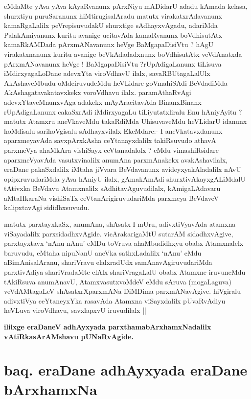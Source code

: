\stext

\begin{artha}
eMdaMte  yAva yAva kAyaRvanunx pArxNiyu mADidarU  adadu kAmada kelasa,
shurxtiyu puruSaranunx hiMtirugisalAradu matutx virakatxrAdavanunx
kamaRgaLalilx peVrepisuvudakU shurxtige sAdhayxvAgadu, adariMda
PalakAmiyanunx kuritu avanige ucitavAda kamaRvanunx boVdhisutAtx
kamaRkAMDada pArxmANavanunx heVge BaMgapaDisiVtu ? hAgU virakatxnanunx
kuritu avanige beVkAdadadxnunx boVdhisutAtx veVdAnatxda pArxmANavanunx
heVge ! BaMgapaDisiVtu ?rUpAdigaLanunx tiLisuva iMdirxyagaLoDane
adevxYta viroVdhavU ilalx, savaRBUtagaLalUlx AkAshaveMbudu
oMdeiruvudeMdu heVLidare goVmahiSAdi BeVdadiMda AkAshagatavakatavxkekx
voroVdhavu ilalx. paramAthaRvAgi adevxYtaveMnunxvAga adakekx
mAyAracitavAda BinanxBinanx rUpAdigaLanunx cakaSxrAdi iMdirxyagaLu
tiLiyutatxliralu Enu hAniyAyitu ? matutx Atamxru aneVkaveMdu
takaRdiMda UhisuvaveMdu heVLidarU idanunx hoMdisalu sarihoVgisalu
sAdhayxvilalx EkeMdare:- I aneVkatavxdanunx aparxmeyavAda
savxpArxkAsha ceYtanayxdalilx takiRsuvudo athavA parxmeVya ahaMkAra
vishiSayx ceVtanadalolx ? eMdu vimashiRsidare aparxmeVyavAda
vasutxvinalilx anumAna parxmAnakekx avakAshavilalx, eraDane
pakaSxdalilx iMtaha jiVvara BeVdavanunx avideyxyakAladalilx nAvU
opipxruvudariMda yAva hAniyU ilalx, gAmakAmAdi shurxtivAkayxgALiMdalU
tAtivxka BeVdavu Atamxnalilx sAdhitavAguvudilalx, kAmigaLAdavaru
aMtaHkaraNa vishiSaTx ceVtanArigiruvudariMda parxmeya BeVdaveV
kalipxtavAgi sididhxsuvudu.

matutx parxtayxkaSx, anumAna, shAsatx I mUru, adivxtiVyavAda atamxna
viSayadalilx parxsidadhxvAgide. vicArakarigaMtU sutarAM sidadhxvAgive,
parxtayxtavx `nAnu nAnu' eMDu toVruva ahaMbudidhxyu obabx Atamxnalelx
baruvudu, eMtaha nipuNanU aneVka sathxLadalilx `nAnu' eMdu
aBimAnisalAranu, shariVravu elalxradUdx samAnavAgiruvudariMda
parxtivAdiya shariVradaMte elAlx shariVragaLalU obabx Atamxne
iruvuneMdu tAkiRsuva anumAnavU, AtamxvasutxvoMdeV eMdu sAruva
(mogaLaguva) veVdAMtagaLeV shAsatxrXparxmANa DiMDima
parxmANavAgive. hiVgiralu adivxtiVya ceYtaneyxYka rasavAda Atamxna
viSayxdalilx pUvaRvAdiyu heVLuva viroVdhavu, savxlapxvU iruvudilalx ||
\end{artha}

\begin{center}
\textbf{ililxge eraDaneV adhAyxyada parxthamabArxhamxNadalilx vAtiRkasArAMshavu pUNaRvAgide.}
\end{center}

\section*{baq. eraDane adhAyxyada eraDane bArxhamxNa}

